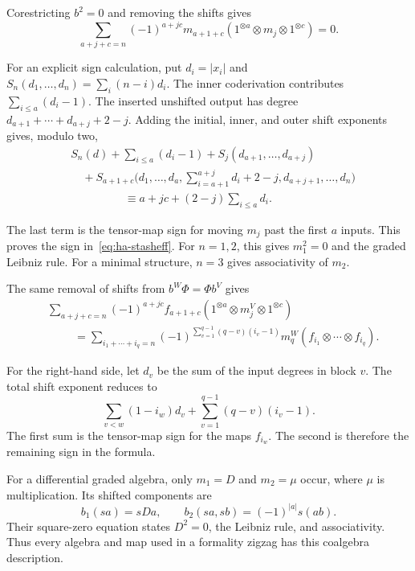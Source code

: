 Corestricting $b^2=0$ and removing the shifts gives
\begin{equation}\label{eq:ha-stasheff}
 \sum_{a+j+c=n}(-1)^{a+jc}
 m_{a+1+c}(1^{\otimes a}\otimes m_j\otimes1^{\otimes c})=0.
\end{equation}

For an explicit sign calculation, put $d_i=|x_i|$ and
$S_n(d_1,\ldots,d_n)=\sum_i(n-i)d_i$.
The inner coderivation contributes $\sum_{i\leq a}(d_i-1)$.
The inserted unshifted output has degree
$d_{a+1}+\cdots+d_{a+j}+2-j$.
Adding the initial, inner, and outer shift exponents gives, modulo two,
\[
 \begin{split}
 &S_n(d)+\sum_{i\leq a}(d_i-1)
   +S_j(d_{a+1},\ldots,d_{a+j})\\
 &\quad+
 S_{a+1+c}\bigl(d_1,\ldots,d_a,
             \textstyle\sum_{i=a+1}^{a+j}d_i+2-j,
             d_{a+j+1},\ldots,d_n\bigr)\\
 &\hspace{2cm}\equiv a+jc+(2-j)\sum_{i\leq a}d_i .
 \end{split}
\]

The last term is the tensor-map sign for moving $m_j$ past the
first $a$ inputs. This proves the sign in~\eqref{eq:ha-stasheff}.
For $n=1,2$, this gives $m_1^2=0$ and the graded Leibniz rule.
For a minimal structure, $n=3$ gives associativity of $m_2$.

The same removal of shifts from $b^W\Phi=\Phi b^V$ gives
\begin{equation}\label{eq:ha-morphism}
 \begin{split}
 &\sum_{a+j+c=n}(-1)^{a+jc}
 f_{a+1+c}(1^{\otimes a}\otimes m_j^V\otimes1^{\otimes c})\\
 &\hspace{1cm}=
 \sum_{i_1+\cdots+i_q=n}
 (-1)^{\sum_{v=1}^{q-1}(q-v)(i_v-1)}
 m_q^W(f_{i_1}\otimes\cdots\otimes f_{i_q}).
 \end{split}
\end{equation}

For the right-hand side, let $d_v$ be the sum of the input degrees
in block $v$. The total shift exponent reduces to
\[
 \sum_{v<w}(1-i_w)d_v+
 \sum_{v=1}^{q-1}(q-v)(i_v-1).
\]
The first sum is the tensor-map sign for the maps $f_{i_w}$.
The second is therefore the remaining sign in the formula.

For a differential graded algebra, only $m_1=D$ and $m_2=\mu$ occur,
where $\mu$ is multiplication. Its shifted components are
\[
 b_1(sa)=sDa,\qquad b_2(sa,sb)=(-1)^{|a|}s(ab).
\]
Their square-zero equation states $D^2=0$, the Leibniz rule, and
associativity. Thus every algebra and map used in a formality zigzag
has this coalgebra description.

